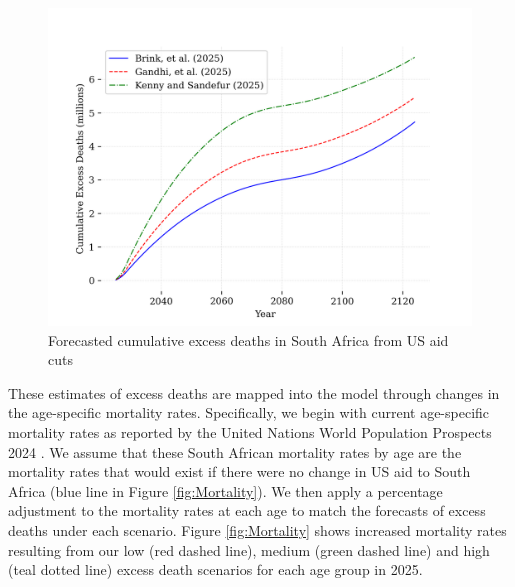 \documentclass[letterpaper,12pt]{article}
\theoremstyle{definition}
\begin{document}
\begin{spacing}{1.5}
\begin{figure}[H]
    \caption{Forecasted cumulative excess deaths in South Africa from US aid cuts}
    \label{fig:cumDeaths}
    \centering
    \includegraphics[scale=0.75]{./tables_figures/cumulative_excess_deaths.png}
\end{figure}

These estimates of excess deaths are mapped into the model through changes in the age-specific mortality rates. Specifically, we begin with current age-specific mortality rates as reported by the United Nations World Population Prospects 2024 \citep{UN2024}. We assume that these South African mortality rates by age are the mortality rates that would exist if there were no change in US aid to South Africa (blue line in Figure \ref{fig:Mortality}). We then apply a percentage adjustment to the mortality rates at each age to match the forecasts of excess deaths under each scenario. Figure \ref{fig:Mortality} shows increased mortality rates resulting from our low (red dashed line), medium (green dashed line) and high (teal dotted line) excess death scenarios for each age group in 2025.



\end{spacing}
\end{document}
